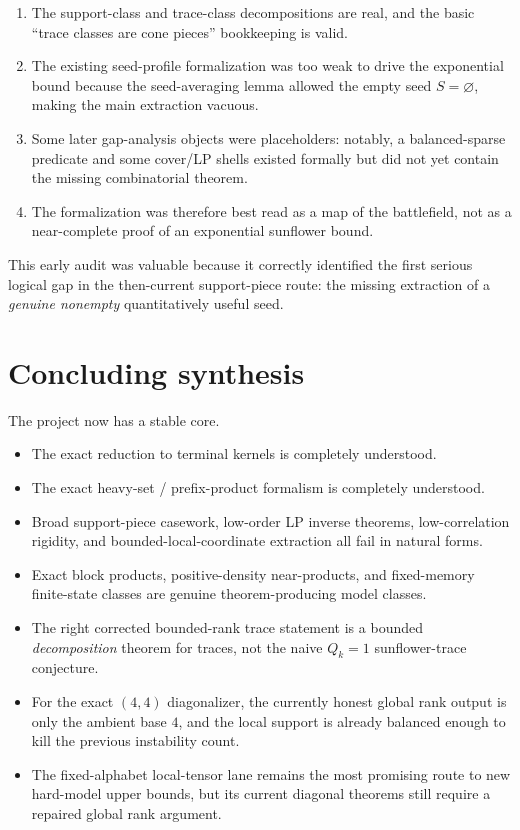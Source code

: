 \documentclass[11pt]{article}
\theoremstyle{definition}
\newcommand{\1}{\mathbf{1}}
\begin{document}
\begin{enumerate}[label=(\alph*),leftmargin=2.2em]
\item The support-class and trace-class decompositions are real, and the basic ``trace classes are cone pieces'' bookkeeping is valid.
\item The existing seed-profile formalization was too weak to drive the exponential bound because the seed-averaging lemma allowed the empty seed $S=\varnothing$, making the main extraction vacuous.
\item Some later gap-analysis objects were placeholders: notably, a balanced-sparse predicate and some cover/LP shells existed formally but did not yet contain the missing combinatorial theorem.
\item The formalization was therefore best read as a map of the battlefield, not as a near-complete proof of an exponential sunflower bound.
\end{enumerate}

This early audit was valuable because it correctly identified the first serious logical gap in the then-current support-piece route: the missing extraction of a \emph{genuine nonempty} quantitatively useful seed.

\section{Concluding synthesis}\label{sec:conclusion}
The project now has a stable core.

\begin{itemize}[leftmargin=2em]
\item The exact reduction to terminal kernels is completely understood.
\item The exact heavy-set / prefix-product formalism is completely understood.
\item Broad support-piece casework, low-order LP inverse theorems, low-correlation rigidity, and bounded-local-coordinate extraction all fail in natural forms.
\item Exact block products, positive-density near-products, and fixed-memory finite-state classes are genuine theorem-producing model classes.
\item The right corrected bounded-rank trace statement is a bounded \emph{decomposition} theorem for traces, not the naive $Q_k=1$ sunflower-trace conjecture.
\item For the exact $(4,4)$ diagonalizer, the currently honest global rank output is only the ambient base $4$, and the local support is already balanced enough to kill the previous instability count.
\item The fixed-alphabet local-tensor lane remains the most promising route to new hard-model upper bounds, but its current diagonal theorems still require a repaired global rank argument.
\end{itemize}
\end{document}
